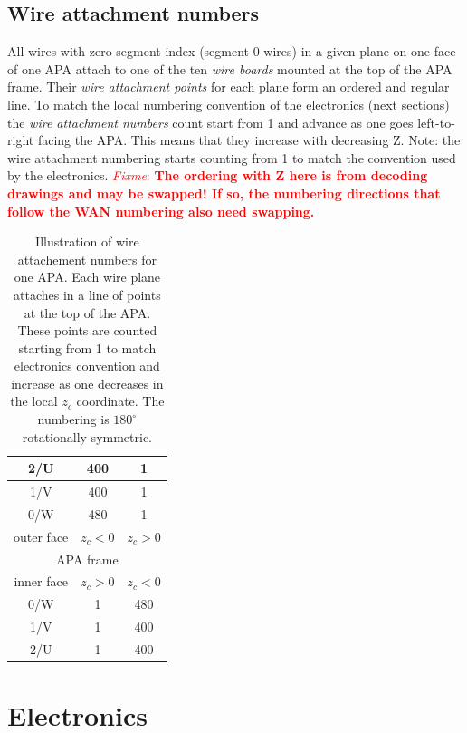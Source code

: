 \documentclass[pdftex,12pt,letter]{article}
\newcommand{\fixme}[1]{\textcolor{red}{\textit{Fixme}: \textbf{#1}}}
\begin{document}
\subsection{Wire attachment numbers}
\label{sec:wan}

All wires with zero segment index (segment-0 wires) in a given plane
on one face of one APA attach to one of the ten \textit{wire boards}
mounted at the top of the APA frame.  Their \textit{wire attachment
  points} for each plane form an ordered and regular line. 
To match the local numbering convention of the electronics (next
sections) the \textit{wire attachment numbers} count start from 1 and
advance as one goes left-to-right facing the APA.  This means that
they increase with decreasing Z.  Note: the wire attachment numbering
starts counting from 1 to match the convention used by the
electronics. \fixme{The ordering with Z here is from decoding drawings
  and may be swapped!  If so, the numbering directions that follow the
  WAN numbering also need swapping.}

\begin{table}[htp]
  \centering
  \begin{tabular}[h]{ccc}
    \hline
    2/U & 400 & 1 \\
    \hline
    1/V & 400 & 1 \\
    \hline
    0/W & 480 & 1 \\
    \hline
    outer face & $z_c<0$  & $z_c>0$\\
    \hline
    \multicolumn{3}{|c|}{APA frame}\\
    \hline
    inner face & $z_c>0$ & $z_c<0$\\
    \hline
    0/W & 1 & 480 \\
    \hline
    1/V & 1 & 400 \\
    \hline
    2/U & 1 & 400 \\
    \hline
  \end{tabular}
  \caption{Illustration of wire attachement numbers for one APA.  Each wire plane attaches in a line of points at the top of the APA.  These points are counted starting from 1 to match electronics convention and increase as one decreases in the local $z_c$ coordinate.  The numbering is $180^\circ$ rotationally symmetric.}
  \label{tab:wan}
\end{table}

\section{Electronics}
\end{document}
